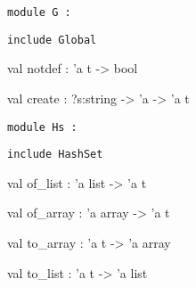 \documentclass[11pt]{article}
\begin{document}
\begin{ocamldoccode}
{\tt{module }}{\tt{G}}{\tt{ : }}\end{ocamldoccode}
\label{module:Util.G}

\begin{ocamldocsigend}


{\tt{include }}{\tt{Global}}

\label{val:Util.G.notdef}\begin{ocamldoccode}
val notdef : 'a t -> bool
\end{ocamldoccode}


\label{val:Util.G.create}\begin{ocamldoccode}
val create : ?s:string -> 'a -> 'a t
\end{ocamldoccode}
\end{ocamldocsigend}






\begin{ocamldoccode}
{\tt{module }}{\tt{Hs}}{\tt{ : }}\end{ocamldoccode}
\label{module:Util.Hs}

\begin{ocamldocsigend}


{\tt{include }}{\tt{HashSet}}

\label{val:Util.Hs.of-underscorelist}\begin{ocamldoccode}
val of_list : 'a list -> 'a t
\end{ocamldoccode}


\label{val:Util.Hs.of-underscorearray}\begin{ocamldoccode}
val of_array : 'a array -> 'a t
\end{ocamldoccode}


\label{val:Util.Hs.to-underscorearray}\begin{ocamldoccode}
val to_array : 'a t -> 'a array
\end{ocamldoccode}


\label{val:Util.Hs.to-underscorelist}\begin{ocamldoccode}
val to_list : 'a t -> 'a list
\end{ocamldoccode}
\end{ocamldocsigend}
\end{document}
